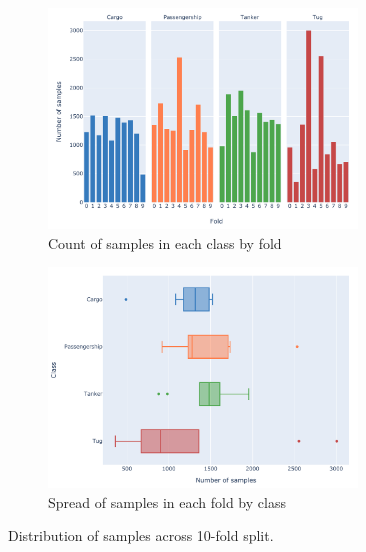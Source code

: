 \begin{figure}
    \ContinuedFloat
    \begin{subfigure}[t]{\textwidth}
        \centering
        \includegraphics[width=0.90\textwidth]{img/ch3/deepship_figs/10_class_counts_facet.pdf}
        \caption{Count of samples in each class by fold}
        \label{fig:10-fold-counts-facet}
    \end{subfigure}

    \vspace{1cm}
    
    \begin{subfigure}[t]{\textwidth}
        \centering
        \includegraphics[width=0.90\textwidth]{img/ch3/deepship_figs/10_fold_spread.pdf}
        \caption{Spread of samples in each fold by class}
        \label{fig:10-fold-spread}
    \end{subfigure}
    \caption{Distribution of samples across 10-fold split.}
    \label{fig:10-fold-overview}
\end{figure}

